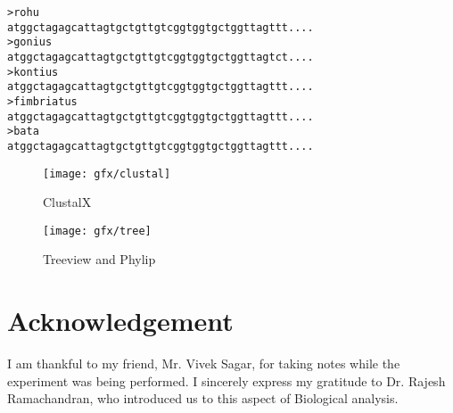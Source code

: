 \begin{lstlisting}[float,caption=Format of the source file,label=tree_sourcefile]
>rohu
atggctagagcattagtgctgttgtcggtggtgctggttagttt....
>gonius
atggctagagcattagtgctgttgtcggtggtgctggttagtct....
>kontius
atggctagagcattagtgctgttgtcggtggtgctggttagttt....
>fimbriatus
atggctagagcattagtgctgttgtcggtggtgctggttagttt....
>bata
atggctagagcattagtgctgttgtcggtggtgctggttagttt....
\end{lstlisting}

\begin{figure}[bth]
	\begin{center}
		\texttt{[image: gfx/clustal]}
	\end{center}
\caption[ClustalX]{ClustalX}
\label{clustal}
\end{figure}

\begin{figure}[bth]
	\begin{center}
		\texttt{[image: gfx/tree]}
	\end{center}
\caption[Treeview and Phylip]{Treeview and Phylip}
\label{tree}
\end{figure}


\section{Acknowledgement}
	I am thankful to my friend, Mr. Vivek Sagar, for taking notes while the experiment was being performed. I sincerely express my gratitude to Dr. Rajesh Ramachandran, who introduced us to this aspect of Biological analysis.